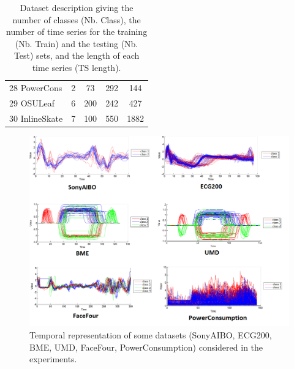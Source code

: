 \begin{table}[h!]
\begin{center}
{\begin{tabular}{lcccc}
				28 PowerCons		& 2 & 73  & 292  & 144 \\						
				29 OSULeaf			& 6 & 200 & 242  & 427 \\
				30 InlineSkate		& 7 & 100 & 550  & 1882\\	    
				\hline
			\end{tabular}
		}
	\end{center}
	\caption{Dataset description giving the number of classes (Nb. Class), the number of time series for the training (Nb. Train) and the testing (Nb. Test) sets, and the length of each time series (TS length).}
	\label{tab:DatasetDescription}
\end{table}

\begin{figure}[h!]
	\centering
	\includegraphics[width=0.95\linewidth]{images/dataset_exp}
	\caption{Temporal representation of some datasets (SonyAIBO, ECG200, BME, UMD, FaceFour, PowerConsumption) considered in the experiments.}
	\label{fig:dataset}
\end{figure}

